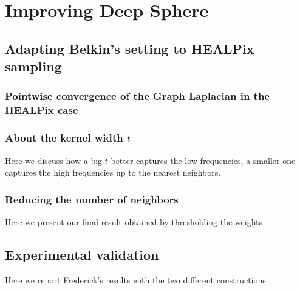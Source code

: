 

\section{Improving Deep Sphere}
\subsection{Adapting Belkin's setting to HEALPix sampling}
\subsubsection*{Pointwise convergence of the Graph Laplacian in the HEALPix case}
\subsubsection*{About the kernel width $t$}
Here we discuss how a big $t$ better captures the low frequencies, a smaller one captures the high frequencies up to the nearest neighbors.
\subsubsection*{Reducing the number of neighbors}
Here we present our final result obtained by thresholding the weights
\subsection{Experimental validation}
Here we report Frederick's results with the two different constructions
